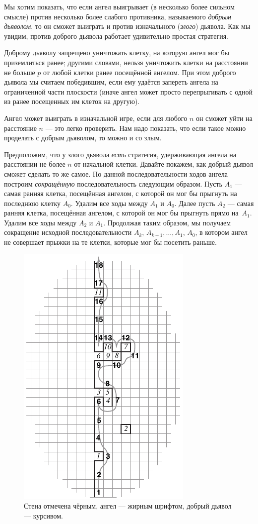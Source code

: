 Мы хотим показать, что если ангел выигрывает (в несколько более сильном смысле) против несколько более слабого противника, называемого \emph{добрым дьяволом}, то он сможет выиграть и против изначального (\emph{злого}) дьявола.
Как мы увидим, против доброго дьявола работает удивительно простая стратегия.

Доброму дьяволу запрещено уничтожать клетку, на которую ангел мог бы приземлиться ранее; 
другими словами, нельзя уничтожить клетки на расстоянии не больше $p$ от любой клетки ранее посещённой ангелом.
При этом доброго дьявола мы считаем победившим, если ему удаётся запереть ангела на ограниченной части плоскости (иначе ангел может просто перепрыгивать с одной из ранее посещенных им клеток на другую).

Ангел может выиграть в изначальной игре, если для любого $n$ он сможет уйти на расстояние $n$ --- это легко проверить.
Нам надо показать, что если такое можно проделать с добрым дьяволом, то можно и со злым.

Предположим, что у злого дьявола \emph{есть} стратегия, удерживающая ангела на расстоянии не более $n$ от начальной клетки.
Давайте покажем, как добрый дьявол сможет сделать то же самое.
По данной последовательности ходов ангела построим \emph{сокращённую} последовательность следующим образом.
Пусть $A_1$ --- самая ранняя клетка, посещённая ангелом, с которой он мог бы прыгнуть на последнюю клетку $A_0$.
Удалим все ходы между $A_1$ и $A_0$.
Далее пусть $A_2$ --- самая ранняя клетка, посещённая ангелом, с которой он мог бы прыгнуть прямо на~$A_1$.
Удалим все ходы между $A_2$ и $A_1$.
Продолжая таким образом, мы получаем сокращение исходной последовательности $A_k$, $A_{k-1}, \dots, A_1$, $A_0$, в котором ангел не совершает прыжки на те клетки, которые мог бы посетить раньше.

\begin{figure}[bt!]
\centering
\includegraphics[scale=1]{pics/angel}
\caption{Стена отмечена чёрным, ангел --- жирным шрифтом, добрый дьявол --- курсивом.}
\label{pic:angel}
\end{figure}

